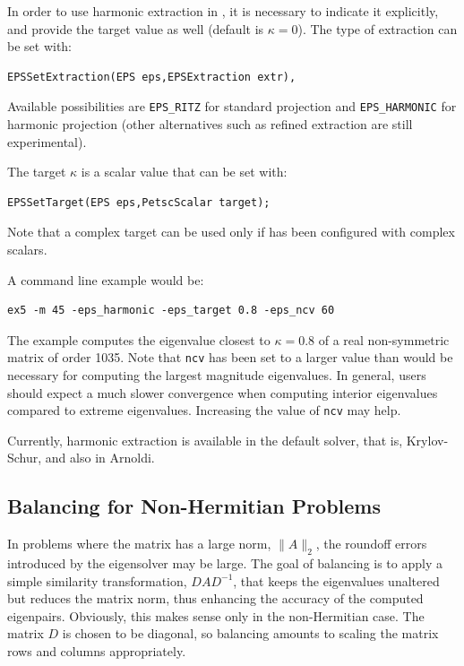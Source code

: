 In order to use harmonic extraction in \slepc, it is necessary to indicate it explicitly, and provide the target value as well (default is $\kappa=0$). The type of extraction can be set with:
	\begin{Verbatim}[fontsize=\small]
	EPSSetExtraction(EPS eps,EPSExtraction extr),
	\end{Verbatim}
Available possibilities are \texttt{EPS\_RITZ} for standard projection and \texttt{EPS\_HARMONIC} for harmonic projection (other alternatives such as refined extraction are still experimental).

The target $\kappa$ is a scalar value that can be set with:
	\begin{Verbatim}[fontsize=\small]
	EPSSetTarget(EPS eps,PetscScalar target);
	\end{Verbatim}
Note that a complex target can be used only if \slepc has been configured with complex scalars.

A command line example would be:
	\begin{Verbatim}[fontsize=\small]
	ex5 -m 45 -eps_harmonic -eps_target 0.8 -eps_ncv 60
	\end{Verbatim}
The example computes the eigenvalue closest to $\kappa=0.8$ of a real non-symmetric matrix of order 1035. Note that \texttt{ncv} has been set to a larger value than would be necessary for computing the largest magnitude eigenvalues. In general, users should expect a much slower convergence when computing interior eigenvalues compared to extreme eigenvalues. Increasing the value of \texttt{ncv} may help.

Currently, harmonic extraction is available in the default  solver, that is, Krylov-Schur, and also in Arnoldi.

\subsection{Balancing for Non-Hermitian Problems}
\label{sec:balancing}

In problems where the matrix has a large norm, $\|A\|_2$, the roundoff errors introduced by the eigensolver may be large. The goal of balancing is to apply a simple similarity transformation, $DAD^{-1}$, that keeps the eigenvalues unaltered but reduces the matrix norm, thus enhancing the accuracy of the computed eigenpairs. Obviously, this makes sense only in the non-Hermitian case. The matrix $D$ is chosen to be diagonal, so balancing amounts to scaling the matrix rows and columns appropriately.

